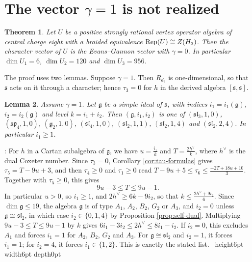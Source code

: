 \documentclass[leqno]{article}
\let\cal\relax
\newcommand{\cal}{\mathcal}
\renewcommand{\leq}{\ensuremath{\leqslant}}
\renewcommand{\geq}{\ensuremath{\geqslant}}
\newcommand{\qed}{\hfill \vrule height6pt  width6pt depth0pt}
\DeclareMathOperator{\Rep}{Rep}
\newtheorem{thm}{Theorem}[section]
\newtheorem{lemma}[thm]{Lemma}
\newenvironment{proof}[1][]{\noindent {\it Proof #1} : }{\hbox{~}\qed
\smallskip
}
\numberwithin{equation}{section}
\begin{document}
\section{The vector \texorpdfstring{$\gamma = 1$}{gamma = 1} is not realized}
\label{sec:gamma-one}

\begin{thm}
\label{thm:gamma-one}
Let $U$ be a positive strongly rational vertex operator algebra of central charge eight with a braided equivalence $\Rep(U) \cong Z(\cal H_3)$. Then the character vector of $U$ is the Evans--Gannon vector with $\gamma = 0$. In particular $\dim U_1 = 6$, $\dim U_2 = 120$ and $\dim U_3 = 956$.
\end{thm}

The proof uses two lemmas. Suppose $\gamma = 1$. Then $R_{d_3}$ is one-dimensional, so that $\mathfrak s$ acts on it through a character; hence $\tau_3 = 0$ for $h$ in the derived algebra $[\mathfrak s,\mathfrak s]$.

\begin{lemma}
\label{lem:simple-ideals}
Assume $\gamma = 1$. Let $\mathfrak g$ be a simple ideal of $\mathfrak s$, with indices $i_1 = i_1(\mathfrak g)$, $i_2 = i_2(\mathfrak g)$ and level $k = i_1+i_2$. Then $(\mathfrak g,i_1,i_2)$ is one of $(\mathfrak{sl}_3,1,0)$, $(\mathfrak{sp}_4,1,0)$, $(\mathfrak g_2,1,0)$, $(\mathfrak{sl}_4,1,0)$, $(\mathfrak{sl}_2,1,1)$, $(\mathfrak{sl}_2,1,4)$ and $(\mathfrak{sl}_2,2,4)$. In particular $i_1 \geq 1$.
\end{lemma}

\begin{proof}
For $h$ in a Cartan subalgebra of $\mathfrak g$, we have $u = \frac{i_1}{k}$ and $T = \frac{2h^\vee}{k}$, where $h^\vee$ is the dual Coxeter number. Since $\tau_3 = 0$, Corollary \ref{cor:tau-formulas} gives $\tau_5 = T-9u+3$, and then $\tau_4 \geq 0$ and $\tau_1 \geq 0$ read $T-9u+5 \leq \tau_6 \leq \frac{-2T+18u+10}{3}$. Together with $\tau_5 \geq 0$, this gives
\[
9u-3 \leq T \leq 9u-1.
\]
In particular $u > 0$, so $i_1 \geq 1$, and $2h^\vee \geq 6k-9i_2$, so that $k \leq \frac{2h^\vee+9i_2}{6}$. Since $\dim \mathfrak g \leq 19$, the algebra $\mathfrak g$ is of type $A_1$, $A_2$, $B_2$, $G_2$ or $A_3$, and $i_2 = 0$ unless $\mathfrak g \cong \mathfrak{sl}_2$, in which case $i_2 \in \{0,1,4\}$ by Proposition \ref{prop:self-dual}. Multiplying $9u-3 \leq T \leq 9u-1$ by $k$ gives $6i_1-3i_2 \leq 2h^\vee \leq 8i_1-i_2$. If $i_2 = 0$, this excludes $A_1$ and forces $i_1 = 1$ for $A_2$, $B_2$, $G_2$ and $A_3$. For $\mathfrak g \cong \mathfrak{sl}_2$ and $i_2 = 1$, it forces $i_1 = 1$; for $i_2 = 4$, it forces $i_1 \in \{1,2\}$. This is exactly the stated list.
\end{proof}
\end{document}
